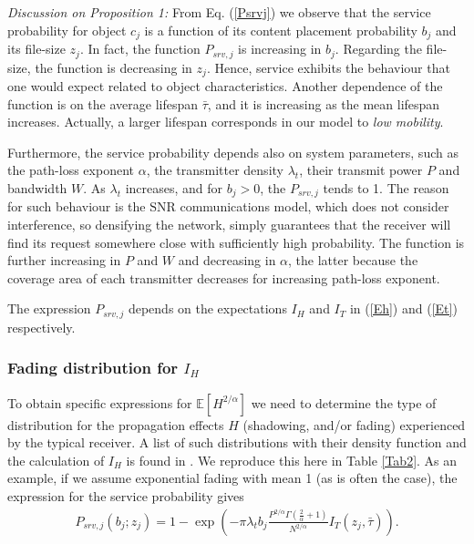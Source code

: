 \documentclass[conference]{IEEEtran}
\newcommand{\esperance}{\mathbb{E}}
\begin{document}
\textit{Discussion on Proposition 1:} From Eq. (\ref{Psrvj}) we observe that the service probability for object $c_j$ is a function of its content placement probability $b_j$ and its file-size $z_j$. In fact, the function $P_{srv,j}$ is increasing in $b_j$. Regarding the file-size, the function is decreasing in $z_j$. Hence, service exhibits the behaviour that one would expect related to object characteristics. Another dependence of the function is on the average lifespan $\bar{\tau}$, and it is increasing as the mean lifespan increases. Actually, a larger lifespan corresponds in our model to \textit{low mobility}.

Furthermore, the service probability depends also on system parameters, such as the path-loss exponent $\alpha$, the transmitter density $\lambda_t$, their transmit power $P$ and bandwidth $W$. As $\lambda_t$ increases, and for $b_j>0$, the $P_{srv,j}$ tends to 1. The reason for such behaviour is the $\mathrm{SNR}$ communications model, which does not consider interference, so densifying the network, simply guarantees that the receiver will find its request somewhere close with sufficiently high probability. The function is further increasing in $P$ and $W$ and decreasing in $\alpha$, the latter because the coverage area of each transmitter decreases for increasing path-loss exponent.

The expression $P_{srv,j}$ depends on the expectations $I_H$  and $I_T$ in (\ref{Eh}) and (\ref{Et}) respectively. 

\subsubsection{Fading distribution for $I_H$}

To obtain specific expressions for $\esperance[H^{2/ \alpha}]$ we need to determine the type of distribution for the propagation effects $H$ (shadowing, and/or fading) experienced by the typical receiver. A list of such distributions with their density function and the calculation of $I_H$ is found in \cite{BartekPIMRC13}. We reproduce this here in Table \ref{Tab2}. As an example, if we assume exponential fading with mean 1 (as is often the case), the expression for the service probability gives
  \begin{eqnarray}
  P_{srv,j}(b_j;z_j) = 1-\exp(-\pi \lambda_t b_j  \frac{P^{2/\alpha}\Gamma(\frac{2}{\alpha}+1)}{N^{2/\alpha}} I_T(z_j,\bar{\tau})).\nonumber
  \end{eqnarray}
\end{document}
